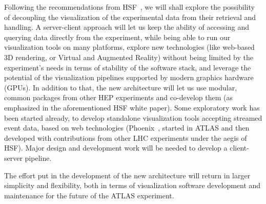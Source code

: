 Following the recommendations from HSF~\cite{ref:hsf-cwp-viz}, we will shall explore the possibility of decoupling the visualization of the experimental data from their retrieval and handling.
A server-client approach will let us keep the ability of accessing and querying data directly from the experiment, while being able to run our visualization tools on many platforms, explore new technologies (like web-based 3D rendering, or Virtual and Augmented Reality) without being limited by the experiment's needs in terms of stability of the software stack, and leverage the potential of the visualization pipelines supported by modern graphics hardware (GPUs). In addition to that, the new architecture will let us use modular, common packages from other HEP experiments and co-develop them (as emphasized in the aforementioned HSF white paper). 
Some exploratory work has been started already, to develop standalone visualization tools accepting streamed event data, based on web technologies (Phoenix~\cite{ref:phoenix-web}, started in ATLAS and then developed with contributions from other LHC experiments under the aegis of HSF). 
Major design and development work will be needed to develop a client-server pipeline.

The effort put in the development of the new architecture will return in larger simplicity and flexibility, both in terms of visualization software development and maintenance for the future of the ATLAS experiment.

